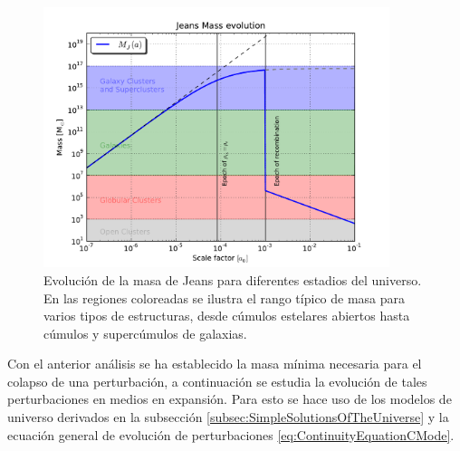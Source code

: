 	
\begin{figure}[htbp]
	\centering
	\includegraphics[width=0.9\textwidth]
	{./figures/2_theoretical_framework/Jeans_Mass_Evolution.pdf}

	\caption{\small{Evolución de la masa de Jeans para diferentes estadios
	del universo. En las regiones coloreadas se ilustra el rango típico de 
	masa para varios tipos de estructuras, desde cúmulos estelares abiertos
	hasta cúmulos y supercúmulos de galaxias.}}
	
	\label{fig:JeansMass}
\end{figure}
	

Con el anterior análisis se ha establecido la masa mínima necesaria para 
el colapso de una perturbación, a continuación se estudia la evolución de
tales perturbaciones en medios en expansión. Para esto se hace uso de los
modelos de universo derivados en la subsección 
\ref{subsec:SimpleSolutionsOfTheUniverse} y la ecuación general de evolución
de perturbaciones \ref{eq:ContinuityEquationCMode}.


